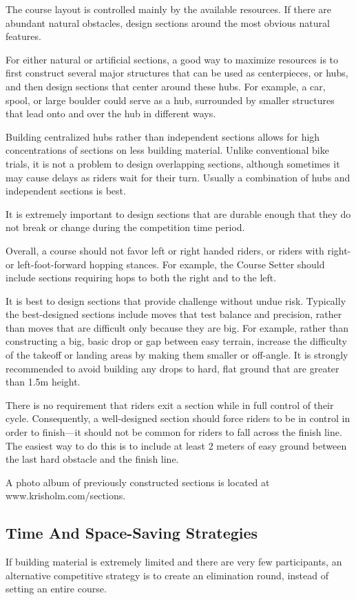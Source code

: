 The course layout is controlled mainly by the available resources.
If there are abundant natural obstacles, design sections around the most obvious natural features.

For either natural or artificial sections, a good way to maximize resources is to first construct several major structures that can be used as centerpieces, or hubs, and then design sections that center around these hubs. 
For example, a car, spool, or large boulder could serve as a hub, surrounded by smaller structures that lead onto and over the hub in different ways.

Building centralized hubs rather than independent sections allows for high concentrations of sections on less building material.
Unlike conventional bike trials, it is not a problem to design overlapping sections, although sometimes it may cause delays as riders wait for their turn. 
Usually a combination of hubs and independent sections is best.

It is extremely important to design sections that are durable enough that they do not break or change during the competition time period.

Overall, a course should not favor left or right handed riders, or riders with right- or left-foot-forward hopping stances.
For example, the Course Setter should include sections requiring hops to both the right and to the left.

It is best to design sections that provide challenge without undue risk. 
Typically the best-designed sections include moves that test balance and precision, rather than moves that are difficult only because they are big. 
For example, rather than constructing a big, basic drop or gap between easy terrain, increase the difficulty of the takeoff or landing areas by making them smaller or off-angle. 
It is strongly recommended to avoid building any drops to hard, flat ground that are greater than 1.5m height.

There is no requirement that riders exit a section while in full control of their cycle. 
Consequently, a well-designed section should force riders to be in control in order to finish---it should not be common for riders to fall across the finish line. 
The easiest way to do this is to include at least 2 meters of easy ground between the last hard obstacle and the finish line.

A photo album of previously constructed sections is located at www.krisholm.com/sections.

\subsection{Time And Space-Saving Strategies}
If building material is extremely limited and there are very few participants, an alternative competitive strategy is to create an elimination round, instead of setting an entire course.

